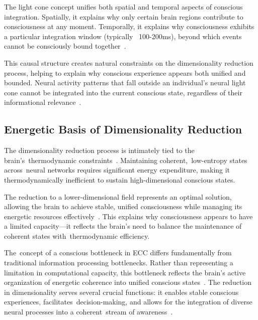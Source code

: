 The light cone concept unifies both spatial and temporal aspects of conscious integration. Spatially, it explains why only certain brain regions contribute to consciousness at any moment. Temporally, it explains why consciousness exhibits a particular integration window (typically ~100-200ms), beyond which events cannot be consciously bound together~\cite{varela1999present,mashour2020conscious}.

This causal structure creates natural constraints on the dimensionality reduction process, helping to explain why conscious experience appears both unified and bounded. Neural activity patterns that fall outside an individual's neural light cone cannot be integrated into the current conscious state, regardless of their informational relevance~\cite{da2024mathematical,bosl2025dynamical}.

\subsection*{Energetic Basis of Dimensionality Reduction}

The dimensionality reduction process is intimately tied to the brain's~thermodynamic constraints~\cite{hameroff2014consciousness,prigogine2018order}. Maintaining coherent,~low-entropy states across~neural networks requires significant energy expenditure, making it thermodynamically inefficient to sustain high-dimensional conscious states.

The reduction to a lower-dimensional field represents an optimal solution, allowing the brain to achieve stable, unified consciousness while managing its energetic resources effectively~\cite{Berndt2012,pellerin2004neuroenergetics}. This explains why consciousness appears to have a limited capacity—it reflects the brain's need to balance the maintenance of coherent states with~thermodynamic efficiency.

The~concept of a conscious bottleneck in ECC differs fundamentally from traditional information processing bottlenecks. Rather than representing a limitation in computational capacity, this bottleneck reflects the brain's active organization of energetic coherence into unified conscious states~\cite{bayne2003what,van2025processes}. The reduction in dimensionality serves several crucial functions: it enables stable conscious experiences, facilitates~decision-making, and allows for the integration of diverse neural processes into a coherent~stream of awareness~\cite{dainton2006stream,varela1996neurophenomenology}.

